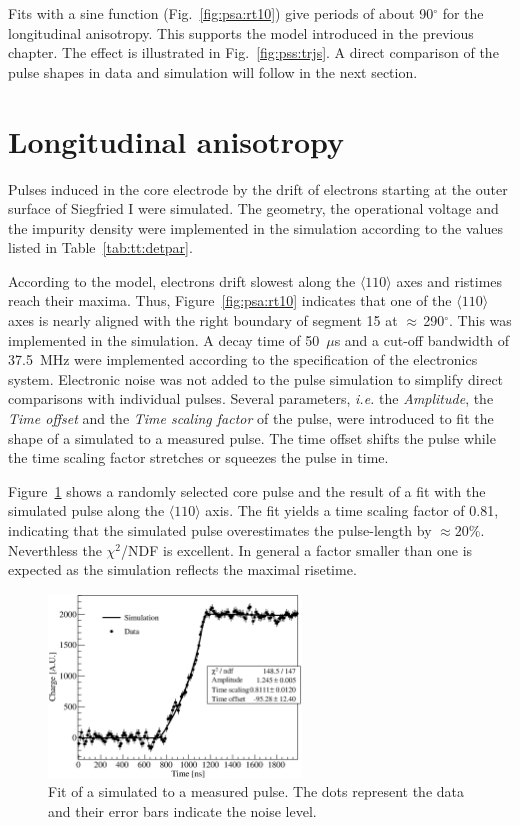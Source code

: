 Fits with a sine function (Fig.~\ref{fig:psa:rt10}) give periods of about 90$^{\circ}$ for the longitudinal anisotropy. This supports the model introduced in the previous chapter. The effect is illustrated in Fig.~\ref{fig:pss:trjs}. A direct comparison of the pulse shapes in data and simulation will follow
in the next section.

\section{Longitudinal anisotropy}
\label{sec:psa:lon}
Pulses induced in the core electrode by the drift of electrons starting at the outer surface of Siegfried I were simulated. The geometry, the operational voltage and the impurity density were implemented in the simulation according to the values listed in Table~\ref{tab:tt:detpar}. 

According to the model, electrons drift slowest along the $\langle 110 \rangle$ axes and ristimes reach their maxima. Thus, Figure~\ref{fig:psa:rt10} indicates that one of the $\langle 110 \rangle$ axes is nearly aligned with the right boundary of segment 15 at $\approx$\,290$^\circ$. This was implemented in the simulation. A decay time of 50~$\mu$s and a cut-off bandwidth of 37.5~MHz were implemented according to the specification of the electronics system. Electronic noise was not added to the pulse simulation to simplify
direct comparisons with individual pulses. Several parameters, \textit{i.e.} the \emph{Amplitude}, the \emph{Time offset} and the \emph{Time scaling factor} of the pulse, were introduced to fit the shape of a simulated to a measured pulse. The time offset shifts the pulse while the time scaling factor stretches or 
squeezes the pulse in time.

Figure~\ref{fig:psa:s2d} shows a randomly selected core pulse and the result of a fit with the simulated pulse along the $\langle 110 \rangle$ axis. The fit yields a time scaling factor of 0.81, indicating that the simulated pulse overestimates the pulse-length by $\approx 20\%$. Neverthless the $\chi^{2}$/NDF is excellent. In general a factor smaller than one is expected as the simulation reflects the maximal risetime.
\begin{figure}[htbp]
\centering
\includegraphics[width=0.6\textwidth]{PSs2d}
\caption{Fit of a simulated to a measured pulse. The dots represent the data and their error bars indicate the noise level.}
\label{fig:psa:s2d}
\end{figure}


